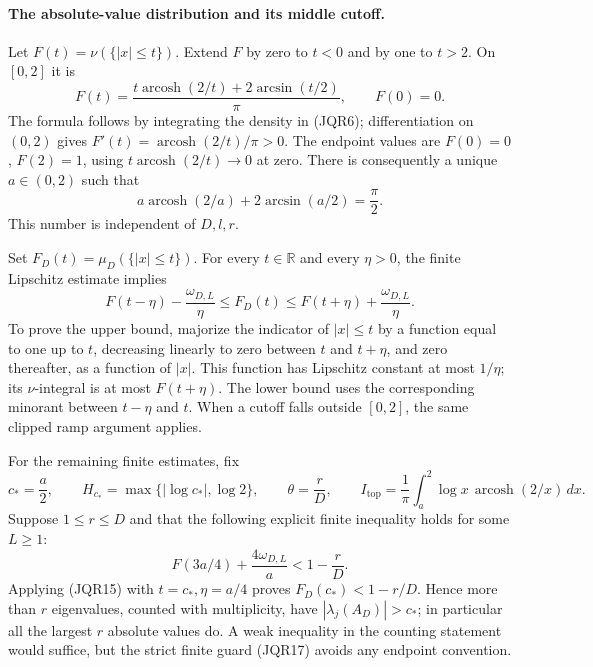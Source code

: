 \documentclass[11pt,a4paper]{article}
\begin{document}
\paragraph{The absolute-value distribution and its middle cutoff.}
Let \(F(t)=\nu(\{|x|\leq t\})\).  Extend \(F\) by zero to \(t<0\)
and by one to \(t>2\).  On \([0,2]\) it is
\[
 F(t)=\frac{t\operatorname{arcosh}(2/t)+2\arcsin(t/2)}{\pi},
 \qquad F(0)=0.
 \tag{JQR13}
\]
The formula follows by integrating the density in (JQR6);
differentiation on \((0,2)\) gives
\(F'(t)=\operatorname{arcosh}(2/t)/\pi>0\).
The endpoint values are \(F(0)=0\), \(F(2)=1\), using
\(t\operatorname{arcosh}(2/t)\to0\) at zero.
There is consequently a unique \(a\in(0,2)\) such that
\[
 a\operatorname{arcosh}(2/a)+2\arcsin(a/2)=\frac{\pi}{2}.
 \tag{JQR14}
\]
This number is independent of \(D,l,r\).

Set \(F_D(t)=\mu_D(\{|x|\leq t\})\).  For every \(t\in\mathbb R\)
and every \(\eta>0\), the finite Lipschitz estimate implies
\[
 F(t-\eta)-\frac{\omega_{D,L}}{\eta}
 \leq F_D(t)
 \leq F(t+\eta)+\frac{\omega_{D,L}}{\eta}.
 \tag{JQR15}
\]
To prove the upper bound, majorize the indicator of \(|x|\leq t\)
by a function equal to one up to \(t\), decreasing linearly to zero
between \(t\) and \(t+\eta\), and zero thereafter, as a function of
\(|x|\).  This function has Lipschitz constant at most \(1/\eta\);
its \(\nu\)-integral is at most \(F(t+\eta)\).  The lower bound uses
the corresponding minorant between \(t-\eta\) and \(t\).  When a
cutoff falls outside \([0,2]\), the same clipped ramp argument applies.

For the remaining finite estimates, fix
\[
 c_*=\frac a2,\qquad
 H_{c_*}=\max\{|\log c_*|,\log2\},\qquad
 \theta=\frac rD,\qquad
 I_{\mathrm{top}}=\frac1\pi
       \int_a^2\log x\,\operatorname{arcosh}(2/x)\,dx.
 \tag{JQR16}
\]
Suppose \(1\leq r\leq D\) and that the following explicit finite
inequality holds for some \(L\geq1\):
\[
 F(3a/4)+\frac{4\omega_{D,L}}a<1-\frac rD.
 \tag{JQR17}
\]
Applying (JQR15) with \(t=c_*,\eta=a/4\) proves
\(F_D(c_*)<1-r/D\).  Hence more than \(r\) eigenvalues, counted with
multiplicity, have \(|\lambda_j(A_D)|>c_*\); in particular all the
largest \(r\) absolute values do.  A weak inequality in the counting
statement would suffice, but the strict finite guard (JQR17)
avoids any endpoint convention.
\end{document}
